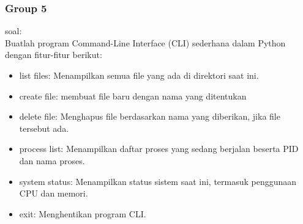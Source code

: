 \documentclass[12pt]{article}
\begin{document}
\subsubsection{Group 5}
soal:\\
Buatlah program Command-Line Interface (CLI) sederhana dalam Python dengan fitur-fitur berikut:
\begin{itemize}
    \item list files: Menampilkan semua file yang ada di direktori saat ini.
    \item create file: membuat file baru dengan nama yang ditentukan
    \item delete file: Menghapus file berdasarkan nama yang diberikan, jika file tersebut ada.
    \item process list: Menampilkan daftar proses yang sedang berjalan beserta PID dan nama proses.
    \item system status: Menampilkan status sistem saat ini, termasuk penggunaan CPU dan memori.
    \item exit: Menghentikan program CLI.
\end{itemize}
\end{document}
